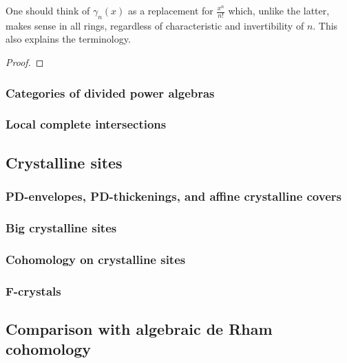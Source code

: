             \begin{remark}
                One should think of $\gamma_n(x)$ as a replacement for $\frac{x^n}{n!}$ which, unlike the latter, makes sense in all rings, regardless of characteristic and invertibility of $n$. This also explains the  terminology.
            \end{remark}
            \begin{proposition} \label{prop: uniqueness_of_PD_structures}
                
            \end{proposition}
                \begin{proof}
                        
                \end{proof}
        
        \subsubsection{Categories of divided power algebras}
        
        \subsubsection{Local complete intersections}
        
    \subsection{Crystalline sites}
        \subsubsection{PD-envelopes, PD-thickenings, and affine crystalline covers}
            
        
        \subsubsection{Big crystalline sites}
        
        \subsubsection{Cohomology on crystalline sites}
        
        \subsubsection{F-crystals}
        
    \subsection{Comparison with algebraic de Rham cohomology}